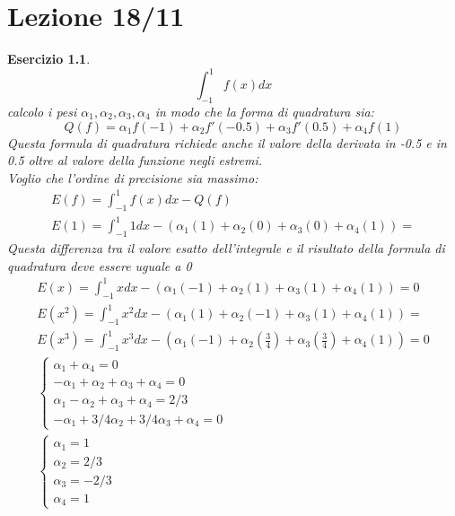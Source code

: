 \documentclass[a4paper, portrait]{book}
\numberwithin{equation}{chapter} %
\newtheorem{exercize}{Esercizio}
\begin{document}
\chapter{Lezione 18/11}
\begin{exercize}
    \begin{equation}
        \int_{-1}^{1} f(x) dx
    \end{equation}
    calcolo i pesi $\alpha_1, \alpha_2, \alpha_3, \alpha_4$ in modo che la forma di quadratura sia:
    \begin{equation}
        Q(f) = \alpha_1 f(-1) + \alpha_2 f'(-0.5) + \alpha_3 f'(0.5) + \alpha_4 f(1)
    \end{equation}
    Questa formula di quadratura richiede anche il valore della derivata in -0.5 e in 0.5 oltre al valore della funzione negli estremi.\\
    Voglio che l'ordine di precisione sia massimo:
    \begin{gather}
        E(f) = \int_{-1}^{1} f(x) dx - Q(f)\\
        E(1) = \int_{-1}^{1} 1 dx - (\alpha_1(1) + \alpha_2 (0) + \alpha_3 (0) + \alpha_4(1)) = 
    \end{gather}
    Questa differenza tra il valore esatto dell'integrale e il risultato della formula di quadratura deve essere uguale a 0
    \begin{gather}
        E(x) = \int_{-1}^{1}x dx - (\alpha_1(-1) + \alpha_2(1) + \alpha_3(1) + \alpha_4(1)) = 0\\
        E(x^2) = \int_{-1}^1 x^2 dx - (\alpha_1(1) + \alpha_2(-1) + \alpha_3(1)+ \alpha_4(1)) = \\
        E(x^3) = \int_{-1}^{1} x^3 dx - (\alpha_1(-1)+\alpha_2(\frac{3}{4})+ \alpha_3(\frac{3}{4})+\alpha_4(1)) = 0\\
        \begin{cases}
            \alpha_1 + \alpha_4 = 0\\
            -\alpha_1 + \alpha_2 + \alpha_3 + \alpha_4 = 0\\
            \alpha_1 - \alpha_2 + \alpha_3 + \alpha_4 = 2/3\\
            -\alpha_1 + 3/4 \alpha_2 + 3/4 \alpha_3 + \alpha_4 = 0
        \end{cases}\\
        \begin{cases}
            \alpha_1 = 1\\
            \alpha_2 = 2/3\\
            \alpha_3 = -2/3\\
            \alpha_4 = 1
        \end{cases}
    \end{gather}
\end{exercize}
\end{document}
